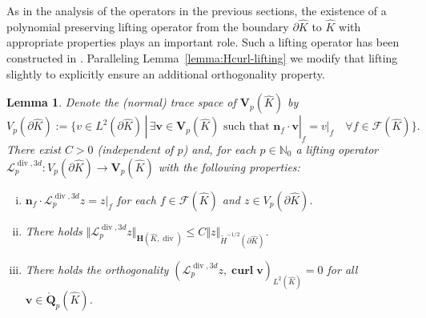 \documentclass{article}
\newtheorem{lemma}[theorem]{Lemma}
\begin{document}
As in the analysis of the operators in the previous sections, the existence of 
a polynomial preserving lifting operator from the boundary $\partial\widehat{K}$ to $\widehat{K}$ 
with appropriate properties plays an important role. Such a lifting operator has been constructed in 
\cite{demkowicz-gopalakrishnan-schoeberl-III}. Paralleling Lemma~\ref{lemma:Hcurl-lifting} 
we modify that lifting slightly to explicitly ensure an additional orthogonality property.

\begin{lemma}
\label{lemma:lifting-operator-div}
Denote the (normal) trace space of ${\mathbf V}_p(\widehat K)$ by 
\begin{equation*} 
V_p(\partial \widehat K):= \{v \in L^2(\partial \widehat K)\,|\, 
\exists {\mathbf v} \in {\mathbf V}_p(\widehat K) \text{ such that } {\mathbf n}_f \cdot {\mathbf v}|_f  = v|_f
\quad 
\forall f \in {\mathcal F}(\widehat K)\}. 
\end{equation*}
There exist $C > 0$ (independent of $p$) and, 
for each $p \in {\mathbb N}_0$ a lifting operator  
$\boldsymbol{\mathcal{L}}^{\operatorname*{div},3d}_p: 
V_p(\partial\widehat K) \rightarrow {\mathbf V}_p(\widehat K)$ 
with the following properties:
\begin{enumerate}[(i)]
\item \label{item:lemma:Hdiv-lifting-i} 
${\mathbf n}_f \cdot \boldsymbol{\mathcal{L}}^{\operatorname*{div},3d}_pz  = z|_f$ for each 
$f \in {\mathcal F}(\widehat K)$ and $z  \in V_p(\partial \widehat K)$. 
\item \label{item:lemma:Hdiv-lifting-iii} There holds 
$\Vert\boldsymbol{\mathcal{L}}^{\operatorname*{div},3d}_p z
\Vert_{\mathbf{H}(\widehat{K},\operatorname*{div})} 
\leq C\Vert z\Vert_{\widetilde{H}^{-1/2}(\partial\widehat{K})}$.
\item \label{item:lemma:Hdiv-lifting-iv} There holds the 
orthogonality $(\boldsymbol{\mathcal{L}}^{\operatorname*{div},3d}_pz,\operatorname*{\mathbf{curl}}\mathbf{v})_{L^2(\widehat{K})} = 0$ for all $\mathbf{v}\in \mathring{\mathbf{Q}}_p(\widehat{K})$.
\end{enumerate}
\end{lemma}
\end{document}
